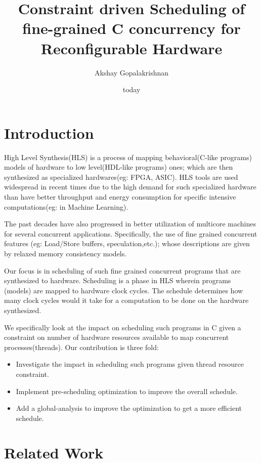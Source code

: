 \documentclass[sigplan,10pt,review]{acmart}
\title{Constraint driven Scheduling of fine-grained C concurrency for Reconfigurable Hardware}
\author{Akshay Gopalakrishnan}
\affiliation{McGill University}
\date{today}
\begin{document}
    \maketitle

    \section{Introduction}

        High Level Synthesis(HLS) is a process of mapping behavioral(C-like programs) models of hardware to low level(HDL-like programs) ones; which are then synthesized as specialized hardwares(eg: FPGA, ASIC).
        HLS tools are used widespread in recent times due to the high demand for such specialized hardware than have better throughput and energy consumption for specific intensive computations(eg: in Machine Learning).  
        
        The past decades have also progressed in better utilization of multicore machines for several concurrent applications. 
        Specifically, the use of fine grained concurrent features (eg: Load/Store buffers, speculation,etc.); whose descriptions are given by relaxed memory consistency models.

        Our focus is in scheduling of such fine grained concurrent programs that are synthesized to hardware. 
        Scheduling is a phase in HLS wherein programs (models) are mapped to hardware clock cycles. 
        The schedule determines how many clock cycles would it take for a computation to be done on the hardware synthesized. 
        
        We specifically look at the impact on scheduling such programs in C given a constraint on number of hardware resources available to map concurrent processes(threads).
        Our contribution is three fold:
        \begin{itemize}
            \item Investigate the impact in scheduling such programs given thread resource constraint.
            \item Implement pre-scheduling optimization to improve the overall schedule.
            \item Add a global-analysis to improve the optimization to get a more efficient schedule.
        \end{itemize}


    \section{Related Work}
\end{document}
